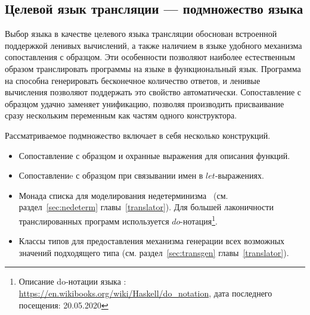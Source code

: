 \subsection{Целевой язык трансляции --- подмножество языка \haskell{}}

Выбор языка \haskell{} в качестве целевого языка трансляции обоснован встроенной поддержкой ленивых вычислений, а также наличием в языке удобного механизма сопоставления с образцом. 
Эти особенности позволяют наиболее естественным образом транслировать программы на языке \miniKanren{} в функциональный язык.
Программа на \miniKanren{} способна генерировать бесконечное количество ответов, и ленивые вычисления позволяют поддержать это свойство автоматически.
Сопоставление с образцом удачно заменяет унификацию, позволяя производить присваивание сразу нескольким переменным как частям одного конструктора.

Рассматриваемое подмножество включает в себя несколько конструкций.
\begin{itemize}
    \item Сопоставление с образцом и охранные выражения для описания функций.
    \item Сопоставлениe с образцом при связывании имен в $let$-выражениях.
    \item Монада списка для моделирования недетерминизма~\cite{Wadler1985HRF} (см. раздел~\ref{sec:nedeterm} главы~\ref{translator}).
    Для большей лаконичности транслированных программ используется $do$-нотация\footnote{Описание do-нотации языка \haskell{}: \url{https://en.wikibooks.org/wiki/Haskell/do\_notation}, дата последнего посещения: 20.05.2020}.
    \item Классы типов для предоставления механизма генерации всех возможных значений подходящего типа (см. раздел~\ref{sec:transgen} главы~\ref{translator}).
\end{itemize}
